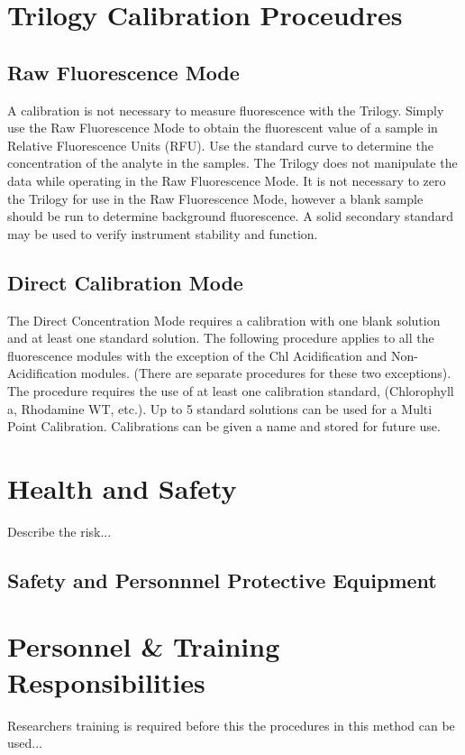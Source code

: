 \documentclass[12pt]{../SOP3_beta}
\begin{document}
\section{Trilogy Calibration Proceudres}
\subsection{Raw Fluorescence Mode}
\NP A calibration is not necessary to measure fluorescence with the Trilogy. Simply use the Raw Fluorescence Mode to obtain the fluorescent value of a sample in Relative Fluorescence Units (RFU). Use the standard curve to determine the concentration of the analyte in the samples. The Trilogy does not manipulate the data while operating in the Raw Fluorescence Mode. It is not necessary to zero the Trilogy for use in the Raw Fluorescence Mode, however a blank sample should be run to determine background fluorescence. A solid secondary standard may be used to verify instrument stability and function. 

\subsection{Direct Calibration Mode}
\NP The Direct Concentration Mode requires a calibration with one blank solution and at least one standard solution. The following procedure applies to all the fluorescence modules with the exception of the Chl Acidification and Non-Acidification modules. (There are separate procedures for these two exceptions). The procedure requires the use of at least one calibration standard, (Chlorophyll a, Rhodamine WT, etc.). Up to 5 standard solutions can be used for a Multi Point Calibration. Calibrations can be given a name and stored for future use. 
\section{Health and Safety}

\NP Describe the risk...


\subsection{Safety and Personnnel Protective Equipment}


\section{Personnel \& Training Responsibilities}

\NP Researchers training is required before this the procedures in this method can be used... 
\end{document}
